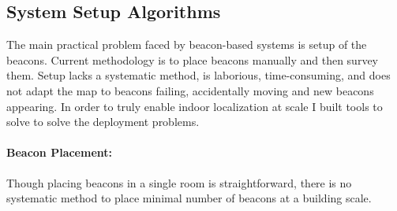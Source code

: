 \documentclass[10pt]{article}
\begin{document}
\subsection{System Setup Algorithms}
The main practical problem faced by beacon-based systems is setup of the beacons. Current methodology is to place beacons manually and then survey them. Setup lacks a systematic method, is laborious, time-consuming, and does not adapt the map to beacons failing, accidentally moving and new beacons appearing. In order to truly enable indoor localization at scale I built tools to solve to solve the deployment problems.
\paragraph{Beacon Placement: }

Though placing beacons in a single room is straightforward, there is no systematic method to place minimal number of beacons at a building scale. 
\end{document}
